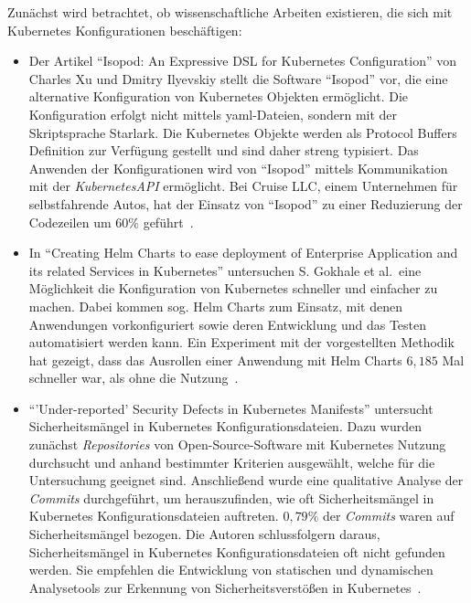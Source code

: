 Zunächst wird betrachtet, ob wissenschaftliche Arbeiten existieren, die sich mit Kubernetes Konfigurationen beschäftigen:
\begin{itemize}
      \item Der Artikel ``Isopod: An Expressive DSL for Kubernetes Configuration'' von Charles Xu und Dmitry Ilyevskiy stellt die
            Software ``Isopod'' vor, die eine alternative Konfiguration von Kubernetes Objekten ermöglicht. Die Konfiguration erfolgt nicht mittels \ac{yaml}-Dateien,
            sondern mit der Skriptsprache Starlark. Die Kubernetes Objekte werden als Protocol Buffers Definition zur Verfügung gestellt und sind daher streng typisiert.
            Das Anwenden der Konfigurationen wird von ``Isopod'' mittels Kommunikation mit der \textit{KubernetesAPI} ermöglicht.
            Bei Cruise LLC, einem Unternehmen für selbstfahrende Autos, hat der Einsatz von ``Isopod'' zu einer Reduzierung der Codezeilen um $60\%$ geführt~\cite{10.1145/3357223.3365759}.
      \item In ``Creating Helm Charts to ease deployment of Enterprise Application and its related Services in Kubernetes'' untersuchen
            S. Gokhale et al.\ eine Möglichkeit die Konfiguration von Kubernetes schneller und einfacher zu machen. Dabei kommen sog. Helm Charts zum Einsatz,
            mit denen Anwendungen vorkonfiguriert sowie deren Entwicklung und das Testen automatisiert werden kann. Ein Experiment mit der vorgestellten Methodik
            hat gezeigt, dass das Ausrollen einer Anwendung mit Helm Charts $6,185$ Mal schneller war, als ohne die Nutzung~\cite{9776450}.
      \item ``'Under-reported' Security Defects in Kubernetes Manifests'' untersucht Sicherheitsmängel in Kubernetes Konfigurationsdateien.
            Dazu wurden zunächst \textit{Repositories} von Open-Source-Software mit Kubernetes Nutzung durchsucht und anhand bestimmter Kriterien ausgewählt, welche für
            die Untersuchung geeignet sind. Anschließend wurde eine qualitative Analyse der \textit{Commits} durchgeführt, um herauszufinden, wie oft Sicherheitsmängel in Kubernetes
            Konfigurationsdateien auftreten. $0,79\%$ der \textit{Commits} waren auf Sicherheitsmängel bezogen. Die Autoren schlussfolgern daraus,
            Sicherheitsmängel in Kubernetes Konfigurationsdateien oft nicht gefunden werden. Sie empfehlen die Entwicklung von statischen und dynamischen Analysetools
            zur Erkennung von Sicherheitsverstößen in Kubernetes~\cite{9476056}.
\end{itemize}

